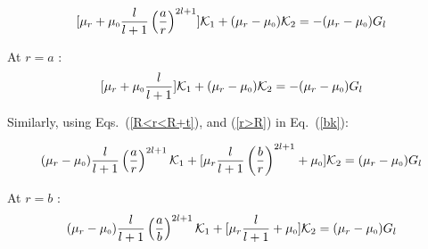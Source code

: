 

$$[\mu_r+\mu_{\scriptscriptstyle 0}\frac{l}{l+1}\left(\dfrac{a}{r}\right)^{2l+1}]\mathcal{K}_1 +(\mu_r-\mu_{\scriptscriptstyle 0})\mathcal{K}_2=-(\mu_r-\mu_{\scriptscriptstyle 0})G_l$$

At $r=a$ :
\begin{equation}\label{es1}
[\mu_r+\mu_{\scriptscriptstyle 0}\frac{l}{l+1}]\mathcal{K}_1 +(\mu_r-\mu_{\scriptscriptstyle 0})\mathcal{K}_2=-(\mu_r-\mu_{\scriptscriptstyle 0})G_l
\end{equation}

Similarly, using Eqs.~(\ref{R<r<R+t}), and (\ref{r>R}) in Eq.~(\ref{bk}):


$$(\mu_r-\mu_{\scriptscriptstyle 0})\frac{l}{l+1}\left(\dfrac{a}{r}\right)^{2l+1}\mathcal{K}_1+[\mu_r\frac{l}{l+1}\left(\dfrac{b}{r}\right)^{2l+1}+\mu_{\scriptscriptstyle 0}]\mathcal{K}_2=(\mu_r-\mu_{\scriptscriptstyle 0})G_l$$

At $r=b$ :
\begin{equation}\label{es2}
(\mu_r-\mu_{\scriptscriptstyle 0})\frac{l}{l+1}\left(\dfrac{a}{b}\right)^{2l+1}\mathcal{K}_1+[\mu_r\frac{l}{l+1}+\mu_{\scriptscriptstyle 0}]\mathcal{K}_2=(\mu_r-\mu_{\scriptscriptstyle 0})G_l
\end{equation}

